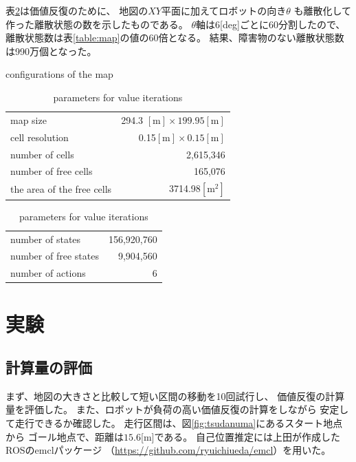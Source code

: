 \documentclass{jarticle}
\begin{document}
表\ref{table:cells}は価値反復のために、
地図の$XY$平面に加えてロボットの向き$\theta$
も離散化して作った離散状態の数を示したものである。
$\theta$軸は6[deg]ごとに60分割したので、
離散状態数は表\ref{table:map}の値の60倍となる。
結果、障害物のない離散状態数は990万個となった。

\begin{table}[bth]
  \caption{conﬁgurations of the map}
	\label{table:map}
  \centering
	\begin{small}
  \begin{tabular}{l|r}
    \hline
    map size & 294.3 $\mathrm{[m]}\times 199.95\mathrm{[m]}$\\
    cell resolution &  0.15$\mathrm{[m]}\times 0.15\mathrm{[m]}$ \\
		number of cells & 2,615,346\\
    number of free cells & 165,076\\
		the area of the free cells & 3714.98$\mathrm{[m^2]}$\\
    \hline
  \end{tabular}
	\end{small}
	\caption{parameters for value iterations}
	\label{table:cells}
  \centering
	\begin{small}
  \begin{tabular}{l|r}
    \hline
    number of states & 156,920,760\\
    number of free states &  9,904,560\\
		number of actions & 6\\
    \hline
  \end{tabular}
	\end{small}
\end{table}

\section{実験}%

\subsection{計算量の評価}
まず、地図の大きさと比較して短い区間の移動を10回試行し、
価値反復の計算量を評価した。
また、ロボットが負荷の高い価値反復の計算をしながら
安定して走行できるか確認した。
走行区間は、図\ref{fig:tsudanuma}にあるスタート地点から
ゴール地点で、距離は$15.6$[m]である。
自己位置推定には上田が作成したROSのemclパッケージ
（\url{https://github.com/ryuichiueda/emcl}）を用いた。
\end{document}

